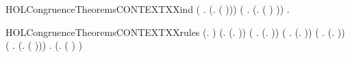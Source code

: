 \begin{SaveVerbatim}{HOLCongruenceTheoremsCONTEXTXXind}
       (\HOLSymConst{\HOLTokenForall{}} .   \HOLSymConst{\HOLTokenImp{}}  (\HOLTokenLambda{}. \HOLConst{\ensuremath{\nu}}  ( ))) \HOLSymConst{\HOLTokenConj{}}
       (\HOLSymConst{\HOLTokenForall{}} .   \HOLSymConst{\HOLTokenImp{}}  (\HOLTokenLambda{}.  ( ) )) \HOLSymConst{\HOLTokenImp{}}
       \HOLSymConst{\HOLTokenForall{}}.   \HOLSymConst{\HOLTokenImp{}}  
\end{SaveVerbatim}
\newcommand{\HOLCongruenceTheoremsCONTEXTXXind}{\UseVerbatim{HOLCongruenceTheoremsCONTEXTXXind}}
\begin{SaveVerbatim}{HOLCongruenceTheoremsCONTEXTXXrules}
\HOLTokenTurnstile{}  (\HOLTokenLambda{}. ) \HOLSymConst{\HOLTokenConj{}} (\HOLSymConst{\HOLTokenForall{}}.  (\HOLTokenLambda{}. )) \HOLSymConst{\HOLTokenConj{}}
   (\HOLSymConst{\HOLTokenForall{}} .   \HOLSymConst{\HOLTokenImp{}}  (\HOLTokenLambda{}.  )) \HOLSymConst{\HOLTokenConj{}}
   (\HOLSymConst{\HOLTokenForall{}} .   \HOLSymConst{\HOLTokenConj{}}   \HOLSymConst{\HOLTokenImp{}}  (\HOLTokenLambda{}.   \HOLSymConst{\ensuremath{+}}  )) \HOLSymConst{\HOLTokenConj{}}
   (\HOLSymConst{\HOLTokenForall{}} .   \HOLSymConst{\HOLTokenConj{}}   \HOLSymConst{\HOLTokenImp{}}  (\HOLTokenLambda{}.   \HOLSymConst{\ensuremath{\parallel}}  )) \HOLSymConst{\HOLTokenConj{}}
   (\HOLSymConst{\HOLTokenForall{}} .   \HOLSymConst{\HOLTokenImp{}}  (\HOLTokenLambda{}. \HOLConst{\ensuremath{\nu}}  ( ))) \HOLSymConst{\HOLTokenConj{}}
   \HOLSymConst{\HOLTokenForall{}} .   \HOLSymConst{\HOLTokenImp{}}  (\HOLTokenLambda{}.  ( ) )
\end{SaveVerbatim}
